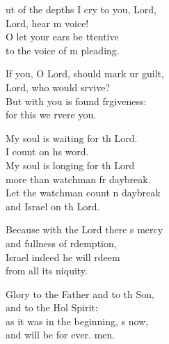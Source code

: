 \settowidth{\versewidth}{Out of the depths I cry to you, O Lord, *}
\begin{psalmverse}%
  \begin{patverse}
ut of the depths I cry to you,  Lord,\Med\\
    Lord, hear m voice!\\
O let your ears be ttentive\Med\\
    to the voice of m pleading.

If you, O Lord, should mark ur guilt,\Med\\
    Lord, who would srvive?\\
But with you is found frgiveness:\Med\\
    for this we rvere you.

My soul is waiting for th Lord.\Med\\
    I count on h\pointup{\i}s word.\\
My soul is longing for th Lord\Med\\
    more than watchman fr daybreak.\\
Let the watchman count n daybreak\Med\\
    and Israel on th Lord.

Because with the Lord there \pointup{\i}s mercy\Med\\
    and fullness of rdemption,\\
Israel indeed he will rdeem\Med\\
    from all its \pointup{\i}niquity.

Glory to the Father and to th Son,\Med\\
    and to the Hol Spirit:\\
as it was in the beginning, \pointup{\i}s now,\Med\\
    and will be for ever. men.
  \end{patverse}
\end{psalmverse}
